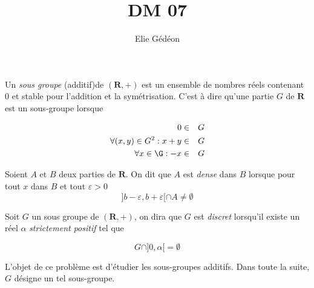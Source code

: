 \documentclass[11pt,a4paper,fleqn]{article}
\author{Elie G\'ed\'eon}
\title{DM 07}
\begin{document}
\maketitle

Un \emph{sous groupe} (additif)de $(\mathbf{R},+)$ est un ensemble de
nombres r{\'e}els contenant 0 et stable pour l'addition et la
sym{\'e}trisation. C'est {\`a} dire qu'une partie $G$ de $\mathbf{R}$ est un
sous-groupe lorsque

\begin{eqnarray*}
0 &\in & G \\
\forall (x,y) \in G^2 : x+y & \in & G \\
\forall x \in \G : -x & \in & G
\end{eqnarray*}

Soient $A$ et $B$ deux parties de $\mathbf{R}$. On dit que $A$ est
\emph{dense} dans $B$ lorsque pour tout $x$ dans $B$ et tout
$\varepsilon >0$
 \[ ]b-\varepsilon,b+\varepsilon [ \cap A \neq
\emptyset\]

 Soit $G$ un sous groupe de $(\mathbf{R},+)$, on dira que $G$ est
\emph{discret} lorsqu'il existe un r{\'e}el $\alpha$
\emph{strictement positif} tel que

\[ G \cap ]0,\alpha[ = \emptyset \]

L'objet de ce probl{\`e}me est d'{\'e}tudier les sous-groupes additifs.
Dans toute la suite, $G$ d{\'e}signe un tel sous-groupe.
\end{document}
